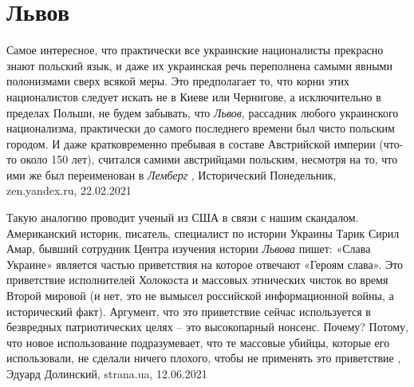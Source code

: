  
 
 
 
 
\chapter{Львов}

Самое интересное, что практически все украинские националисты прекрасно знают
польский язык, и даже их украинская речь переполнена самыми явными полонизмами
сверх всякой меры. Это предполагает то, что корни этих националистов следует
искать не в Киеве или Чернигове, а исключительно в пределах Польши, не будем
забывать, что \emph{Львов}, рассадник любого украинского национализма, практически до
самого последнего времени был чисто польским городом. И даже кратковременно
пребывая в составе Австрийской империи (что-то около 150 лет), считался самими
австрийцами польским, несмотря на то, что ими же был переименован в \emph{Лемберг}
, 
Исторический Понедельник, zen.yandex.ru, 22.02.2021 

Такую аналогию проводит ученый из США в связи с нашим скандалом.  Американский
историк, писатель, специалист по истории Украины Тарик Сирил Амар, бывший
сотрудник Центра изучения истории \emph{Львова} пишет: «Слава Украине» является
частью приветствия на которое отвечают «Героям слава». Это приветствие
исполнителей Холокоста и массовых этнических чисток во время Второй мировой (и
нет, это не вымысел российской информационной войны, а исторический факт).
Аргумент, что это приветствие сейчас используется в безвредных патриотических
целях – это высокопарный нонсенс. Почему? Потому, что новое использование
подразумевает, что те массовые убийцы, которые его использовали, не сделали
ничего плохого, чтобы не применять это приветствие
, 
Эдуард Долинский, strana.ua, 12.06.2021

